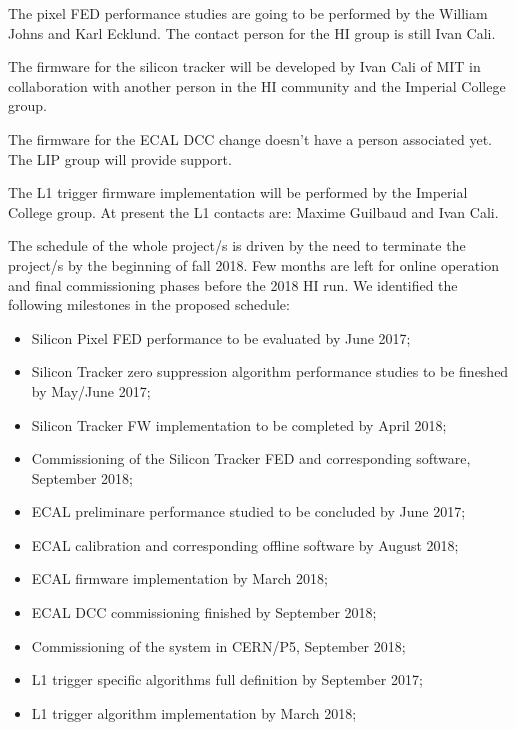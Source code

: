 The pixel FED performance studies are going to be performed by the William Johns and Karl Ecklund. The contact person
for the HI group is still Ivan Cali. 
 
The firmware for the silicon tracker will be developed by Ivan Cali of MIT in collaboration with another person in the HI community and the Imperial
College group.

The firmware for the ECAL DCC change doesn't have a person associated yet. The LIP group will provide support.

The L1 trigger firmware implementation will be performed by the Imperial College group. At present the L1 contacts are: Maxime Guilbaud and Ivan Cali. 

The schedule of the whole project/s is driven by the need to terminate the project/s by the beginning of fall 2018. Few months are left for online operation and final commissioning phases before the 2018 HI run. 
We identified the following milestones in the proposed schedule:

\begin{itemize}
\item Silicon Pixel FED performance to be evaluated by June 2017;
\item Silicon Tracker zero suppression algorithm performance studies to be fineshed by May/June 2017;
\item Silicon Tracker FW implementation to be completed by April 2018;
\item Commissioning of the Silicon Tracker FED and corresponding software, September 2018;
\item ECAL preliminare performance studied to be concluded by June 2017;
\item ECAL calibration and corresponding offline software by August 2018;
\item ECAL firmware implementation by March 2018;
\item ECAL DCC commissioning finished by September 2018;
\item Commissioning of the system in CERN/P5, September 2018;
\item L1 trigger specific algorithms full definition by September 2017;
\item L1 trigger algorithm  implementation by March 2018;
\end{itemize}
